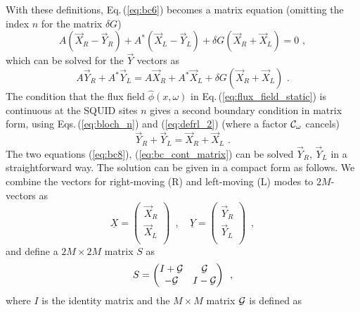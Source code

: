 With these definitions, Eq.\,(\ref{eq:bc6}) becomes a matrix equation
(omitting the index $n$ for the matrix $\delta G$)
%
\begin{equation} \label{eq:bc7}
A \left(\vec{X}_R - \vec{Y}_R \right) + A^* \left(\vec{X}_L - \vec{Y}_L \right) + 
\delta G \left(\vec{X}_R + \vec{X}_L \right) = 0 \, \, ,
\end{equation} 
%
which can be solved for the $\vec{Y}$ vectors as
%
\begin{equation} \label{eq:bc8}
A \vec{Y}_R + A^* \vec{Y}_L =
A \vec{X}_R + A^* \vec{X}_L + \delta G \left(\vec{X}_R + \vec{X}_L \right) \, \, .
\end{equation}
% 
The condition that the flux field $\hat{\phi}(x,\omega)$ in Eq.\,(\ref{eq:flux_field_static})
is continuous at the SQUID sites $n$ gives a second boundary condition in matrix form, 
using Eqs.\,(\ref{eq:bloch_n}) and (\ref{eq:defrl_2}) (where a factor ${\cal C}_{\omega}$ cancels)
%
\begin{equation} \label{eq:bc_cont_matrix}
\vec{Y}_R + \vec{Y}_L = \vec{X}_R + \vec{X}_L \, \, .
\end{equation}
%
The two equations (\ref{eq:bc8}), (\ref{eq:bc_cont_matrix}) can be solved $\vec{Y}_R$, $\vec{Y}_L$
in a straightforward way. The solution can be given in a compact form as follows. 
We combine the vectors for right-moving (R) and left-moving (L) modes to $2M$-vectors as
%
\begin{equation} \label{eq:x_comp}
\underline{X} = 
\begin{pmatrix}
\vec{X}_R \\
\vec{X}_L \\
\end{pmatrix} \, \, \, , \quad
\underline{Y} = 
\begin{pmatrix}
\vec{Y}_R \\
\vec{Y}_L \\
\end{pmatrix} \, \, \, ,
\end{equation}
%
and define a $2M \times 2M$ matrix $S$ as
%
%
\begin{equation} \label{eq:matrix_s}
S =
\begin{pmatrix}
I + {\cal G} & {\cal G} \\
-{\cal G} & I - {\cal G} \\
\end{pmatrix} \, \, \, ,
\end{equation}
%
where $I$ is the identity matrix and the $M \times M$ matrix ${\cal G}$ is defined as
%
\color{red}
